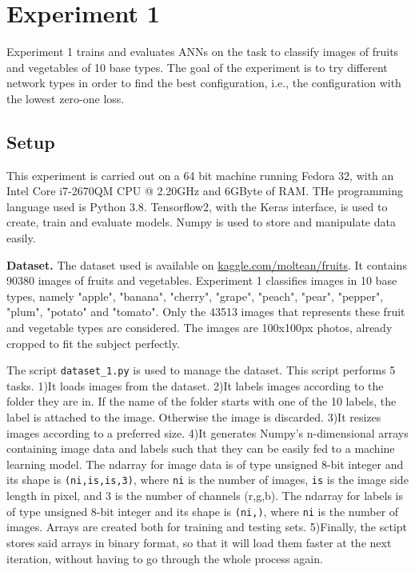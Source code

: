 \section{Experiment 1}
\label{sec:exp1}
Experiment 1 trains and evaluates ANNs on the task to classify images of fruits and vegetables of 10 base types. The goal of the experiment is to try different network types in order to find the best configuration, i.e., the configuration with the lowest zero-one loss.
\subsection{Setup}
This experiment is carried out on a 64 bit machine running Fedora 32, with an Intel\textsuperscript{\textregistered} Core\texttrademark{} i7-2670QM CPU @ 2.20GHz and 6GByte of RAM. THe programming language used is Python 3.8\cite{python3}. Tensorflow2\cite{tensorflow2015-whitepaper}, with the Keras\cite{chollet2015keras} interface, is used to create, train and evaluate models. Numpy\cite{harris2020array} is used to store and manipulate data easily.

\textbf{Dataset.}
The dataset used is available on \href{https://www.kaggle.com/moltean/fruits}{kaggle.com/moltean/fruits}. It contains 90380 images of fruits and vegetables. Experiment 1 classifies images in 10 base types, namely "apple", "banana", "cherry", "grape", "peach", "pear", "pepper", "plum", "potato" and "tomato". Only the 43513 images that represents these fruit and vegetable types are considered. The images are 100x100px photos, already cropped to fit the subject perfectly.

The script \texttt{dataset\_1.py} is used to manage the dataset. This script performs 5 tasks. 1)It loads images from the dataset. 2)It labels images according to the folder they are in. If the name of the folder starts with one of the 10 labels, the label is attached to the image. Otherwise the image is discarded. 3)It resizes images according to a preferred size. 4)It generates Numpy's n-dimensional arrays containing image data and labels such that they can be easily fed to a machine learning model. The ndarray for image data is of type unsigned 8-bit integer and its shape is \texttt{(ni,is,is,3)}, where \texttt{ni} is the number of images, \texttt{is} is the image side length in pixel, and 3 is the number of channels (r,g,b). The ndarray for labels is of type unsigned 8-bit integer and its shape is \texttt{(ni,)}, where \texttt{ni} is the number of images. Arrays are created both for training and testing sets. 5)Finally, the sctipt stores said arrays in binary format, so that it will load them faster at the next iteration, without having to go through the whole process again.

